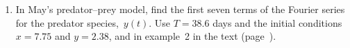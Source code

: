 \begin{enumerate}
\begin{enumerate}
  \item $f(x)= \pi^2-x^2$.

  \item $f(x) = \begin{cases}
0 & \mbox{if $-\pi\le x\le 0$}, \\ 
x^2  & \mbox{if $0\le x\le \pi$}.
\end{cases}$


\end{enumerate}
\item In May's predator--prey model, find the first seven terms of the
Fourier series for the predator species,~$y(t)$.  Use $T = 38.6$ days
and the initial conditions $x = 7.75$ and $y = 2.38$, and in example~2
in the text (page~\pageref{May Fourier}).


\cleardoublepage

\end{enumerate}